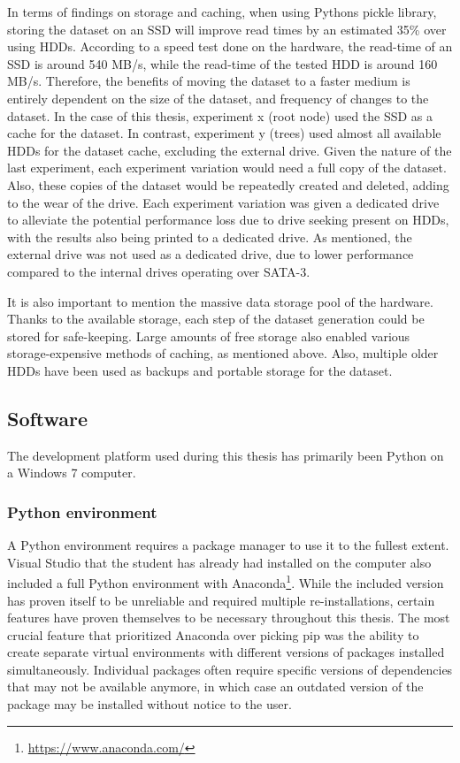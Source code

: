 In terms of findings on storage and caching, when using Pythons pickle library, storing the dataset on an SSD will improve read times by an estimated 35\% over using HDDs.
According to a speed test done on the hardware, the read-time of an SSD is around 540 MB/s, while the read-time of the tested HDD is around 160 MB/s.
Therefore, the benefits of moving the dataset to a faster medium is entirely dependent on the size of the dataset, and frequency of changes to the dataset.
In the case of this thesis, experiment x (root node) used the SSD as a cache for the dataset.%
In contrast, experiment y (trees) used almost all available HDDs for the dataset cache, excluding the external drive.%
Given the nature of the last experiment, each experiment variation would need a full copy of the dataset.
Also, these copies of the dataset would be repeatedly created and deleted, adding to the wear of the drive.
Each experiment variation was given a dedicated drive to alleviate the potential performance loss due to drive seeking present on HDDs, with the results also being printed to a dedicated drive.
As mentioned, the external drive was not used as a dedicated drive, due to lower performance compared to the internal drives operating over SATA-3.

It is also important to mention the massive data storage pool of the hardware.
Thanks to the available storage, each step of the dataset generation could be stored for safe-keeping.
Large amounts of free storage also enabled various storage-expensive methods of caching, as mentioned above.
Also, multiple older HDDs have been used as backups and portable storage for the dataset.

\subsection{Software}
The development platform used during this thesis has primarily been Python on a Windows 7 computer.

\subsubsection{Python environment}
A Python environment requires a package manager to use it to the fullest extent.
Visual Studio that the student has already had installed on the computer also included a full Python environment with Anaconda\footnote{\url{https://www.anaconda.com/}}.
While the included version has proven itself to be unreliable and required multiple re-installations, certain features have proven themselves to be necessary throughout this thesis.
The most crucial feature that prioritized Anaconda over picking pip was the ability to create separate virtual environments with different versions of packages installed simultaneously.
Individual packages often require specific versions of dependencies that may not be available anymore, in which case an outdated version of the package may be installed without notice to the user.


